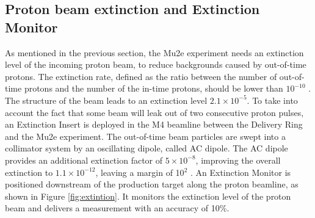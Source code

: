 \subsection{Proton beam extinction and Extinction Monitor}
As mentioned in the previous section, the Mu2e experiment 
needs an extinction level of the incoming proton beam,
to reduce backgrounds caused by out-of-time protons. 
The extinction rate, defined as the ratio between the 
number of out-of-time protons and the number of the in-time protons, should be lower than $10^{-10}$ \cite{bartoszek2015mu2e}. The structure of the beam 
leads to an extinction level $2.1 \times 10^{-5}$. To take into account the fact that some beam will 
leak out of two consecutive proton pulses, an Extinction 
Insert is deployed in the M4 beamline between the Delivery Ring and the Mu2e experiment.
The out-of-time beam particles are swept into a collimator system by an oscillating dipole, called AC dipole.
The AC dipole provides an additional 
extinction factor of $5\times 10^{-8}$, improving the 
overall extinction to $1.1 \times 10^{-12}$, leaving a margin of 10$^2$ \cite{accelerator}. An 
Extinction Monitor is positioned downstream of the 
production target along the proton beamline, as shown in Figure \ref{fig:extintion}. It monitors the 
extinction level of the proton beam and delivers a measurement with an accuracy of 10\%.

